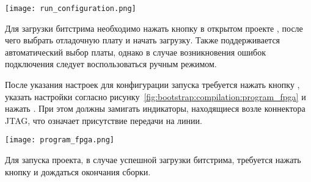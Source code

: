 \begin{center}
  \centering
  \texttt{[image: run\_configuration.png]}
  \label{fig:bootstrap:compilation:run_configuration}
\end{center}

Для загрузки битстрима необходимо нажать кнопку  в
открытом проекте , после чего выбрать отладочную плату и начать загрузку.
Также поддерживается автоматический выбор платы, однако в случае возникновения
ошибок подключения следует воспользоваться ручным режимом.

После указания настроек для конфигурации запуска требуется нажать кнопку ,
указать настройки согласно рисунку~\ref{fig:bootstrap:compilation:program_fpga} и нажать
. При этом должны замигать индикаторы, находящиеся возле коннектора JTAG,
что означает присутствие передачи на линии.

\begin{center}
  \centering
  \texttt{[image: program\_fpga.png]}
  \label{fig:bootstrap:compilation:program_fpga}
\end{center}

Для запуска проекта, в случае успешной загрузки битстрима, требуется нажать кнопку  и
дождаться окончания сборки.
